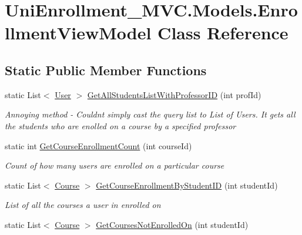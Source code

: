 \hypertarget{class_uni_enrollment___m_v_c_1_1_models_1_1_enrollment_view_model}{}\section{Uni\+Enrollment\+\_\+\+M\+V\+C.\+Models.\+Enrollment\+View\+Model Class Reference}
\label{class_uni_enrollment___m_v_c_1_1_models_1_1_enrollment_view_model}
\subsection*{Static Public Member Functions}
\begin{DoxyCompactItemize}
\item 
static List$<$ \hyperlink{class_uni_enrollment___m_v_c_1_1_models_1_1_user}{User} $>$ \hyperlink{class_uni_enrollment___m_v_c_1_1_models_1_1_enrollment_view_model_ae22e9947b130cec1f228bc059b4e74af}{Get\+All\+Students\+List\+With\+Professor\+ID} (int prof\+Id)
\begin{DoxyCompactList}\small\item\em Annoying method -\/ Couldn\textquotesingle{}t simply cast the query list to List of Users. It gets all the students who are enolled on a course by a specified professor \end{DoxyCompactList}\item 
static int \hyperlink{class_uni_enrollment___m_v_c_1_1_models_1_1_enrollment_view_model_a7bcea2a012bb5b3bc3481b7be74e498a}{Get\+Course\+Enrollment\+Count} (int course\+Id)
\begin{DoxyCompactList}\small\item\em Count of how many users are enrolled on a particular course \end{DoxyCompactList}\item 
static List$<$ \hyperlink{class_uni_enrollment___m_v_c_1_1_models_1_1_course}{Course} $>$ \hyperlink{class_uni_enrollment___m_v_c_1_1_models_1_1_enrollment_view_model_a98aa636acd09b996e836bb45af7fd7af}{Get\+Course\+Enrollment\+By\+Student\+ID} (int student\+Id)
\begin{DoxyCompactList}\small\item\em List of all the courses a user in enrolled on \end{DoxyCompactList}\item 
static List$<$ \hyperlink{class_uni_enrollment___m_v_c_1_1_models_1_1_course}{Course} $>$ \hyperlink{class_uni_enrollment___m_v_c_1_1_models_1_1_enrollment_view_model_aa037125196df4e574df5578152e92510}{Get\+Courses\+Not\+Enrolled\+On} (int student\+Id)

\end{DoxyCompactItemize}
